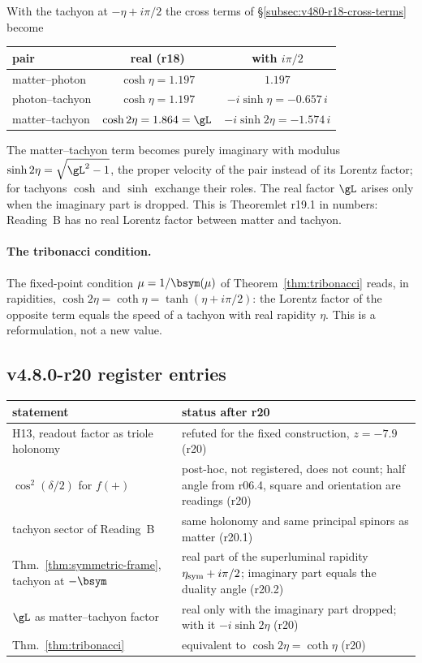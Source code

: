With the tachyon at \(-\eta+i\pi/2\) the cross terms of \S\ref{subsec:v480-r18-cross-terms} become
\begin{center}
\small
\begin{tabular}{@{}lcc@{}}
\toprule
pair & real (r18) & with \(i\pi/2\)\\
\midrule
matter--photon & \(\cosh\eta=1.197\) & \(1.197\)\\
photon--tachyon & \(\cosh\eta=1.197\) & \(-i\sinh\eta=-0.657\,i\)\\
matter--tachyon & \(\cosh2\eta=1.864=\gL\) & \(-i\sinh2\eta=-1.574\,i\)\\
\bottomrule
\end{tabular}
\end{center}
The matter--tachyon term becomes purely imaginary with modulus \(\sinh2\eta=\sqrt{\gL^2-1}\), the proper velocity of the
pair instead of its Lorentz factor; for tachyons \(\cosh\) and \(\sinh\) exchange their roles.  The real factor \(\gL\)
arises only when the imaginary part is dropped.  This is Theoremlet r19.1 in numbers: Reading~B has no real Lorentz factor
between matter and tachyon.

\paragraph{The tribonacci condition.}
The fixed-point condition \(\mu=1/\bsym(\mu)\) of Theorem~\ref{thm:tribonacci} reads, in rapidities,
\(\cosh2\eta=\coth\eta=\tanh(\eta+i\pi/2)\): the Lorentz factor of the opposite term equals the speed of a tachyon with
real rapidity \(\eta\).  This is a reformulation, not a new value.

\subsection*{v4.8.0-r20 register entries}
\label{subsec:v480-r20-register}

\begin{center}
\small
\begin{tabular}{@{}>{\raggedright\arraybackslash}p{}>{\raggedright\arraybackslash}p{}@{}}
\toprule
statement & status after r20\\
\midrule
H13, readout factor as triole holonomy & refuted for the fixed construction, \(z=-7.9\) (r20)\\
\(\cos^2(\delta/2)\) for \(f(+)\) & post-hoc, not registered, does not count; half angle from r06.4, square and orientation are readings (r20)\\
tachyon sector of Reading~B & same holonomy and same principal spinors as matter (r20.1)\\
Thm.~\ref{thm:symmetric-frame}, tachyon at \(-\bsym\) & real part of the superluminal rapidity \(\eta_{\rm sym}+i\pi/2\); imaginary part equals the duality angle (r20.2)\\
\(\gL\) as matter--tachyon factor & real only with the imaginary part dropped; with it \(-i\sinh2\eta\) (r20)\\
Thm.~\ref{thm:tribonacci} & equivalent to \(\cosh2\eta=\coth\eta\) (r20)\\
\bottomrule
\end{tabular}
\end{center}


